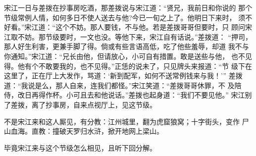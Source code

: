 宋江一日与差拨在抄事房吃酒，那差拨说与宋江道：“贤兄，我前日和你说的
那个节级常例人情，如何多日不使人送去与他?今已一旬之上了。他明日下来时，
须不好看。”宋江道：“这个不妨。那人要钱，不与他。若是差拨哥哥但要时，只
顾问宋江取不妨。那节级要时，一文也没。等他下来，宋江自有话说。”差拨道：
“押司，那人好生利害，更兼手脚了得。倘或有些言语高低，吃了他些羞辱，却道
我不与你通知。”宋江道：“兄长由他，但请放心，小可自有措置。敢是送些与他，
也不见得。他有个不敢要我的，也不见得。”正恁的说未了，只见牌头来报道：“节
级下在这里了，正在厅上大发作，骂道：‘新到配军，如何不送常例钱来与我！’”
差拨道：“我说是么，那人自来，连我们都怪。”宋江笑道：“差拨哥哥休罪，不
及陪侍，改日再得作杯。小可且去和他说话。”差拨也起身道：“我们不要见他。”
宋江别了差拨，离了抄事房，自来点视厅上，见这节级。

不是宋江来和这人厮见，有分教：江州城里，翻为虎窟狼窝；十字街头，变作
尸山血海。直教：撞破天罗归水浒，掀开地网上梁山。

毕竟宋江来与这个节级怎么相见，且听下回分解。